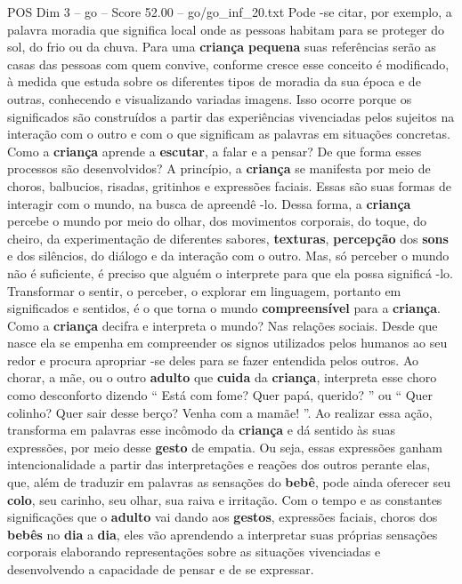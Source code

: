 \begin{textsample}{POS Dim 3 – go – Score 52.00 – go/go\_inf\_20.txt}
Pode -se citar, por exemplo, a palavra moradia que significa local onde as pessoas habitam para se proteger do sol, do frio ou da chuva.
Para uma \textbf{criança} \textbf{pequena} suas referências serão as casas das pessoas com quem convive, conforme cresce esse conceito é modificado, à medida que estuda sobre os diferentes tipos de moradia da sua época e de outras, conhecendo e visualizando variadas imagens.
Isso ocorre porque os significados são construídos a partir das experiências vivenciadas pelos sujeitos na interação com o outro e com o que significam as palavras em situações concretas.
Como a \textbf{criança} aprende a \textbf{escutar}, a falar e a pensar?
De que forma esses processos são desenvolvidos?
A princípio, a \textbf{criança} se manifesta por meio de choros, balbucios, risadas, gritinhos e expressões faciais.
Essas são suas formas de interagir com o mundo, na busca de apreendê -lo.
Dessa forma, a \textbf{criança} percebe o mundo por meio do olhar, dos movimentos corporais, do toque, do cheiro, da experimentação de diferentes sabores, \textbf{texturas}, \textbf{percepção} dos \textbf{sons} e dos silêncios, do diálogo e da interação com o outro.
Mas, só perceber o mundo não é suficiente, é preciso que alguém o interprete para que ela possa significá -lo.
Transformar o sentir, o perceber, o explorar em linguagem, portanto em significados e sentidos, é o que torna o mundo \textbf{compreensível} para a \textbf{criança}.
Como a \textbf{criança} decifra e interpreta o mundo?
Nas relações sociais.
Desde que nasce ela se empenha em compreender os signos utilizados pelos humanos ao seu redor e procura apropriar -se deles para se fazer entendida pelos outros.
Ao chorar, a mãe, ou o outro \textbf{adulto} que \textbf{cuida} da \textbf{criança}, interpreta esse choro como desconforto dizendo “ Está com fome?
Quer papá, querido? ” ou “ Quer colinho?
Quer sair desse berço?
Venha com a mamãe! ”.
Ao realizar essa ação, transforma em palavras esse incômodo da \textbf{criança} e dá sentido às suas expressões, por meio desse \textbf{gesto} de empatia.
Ou seja, essas expressões ganham intencionalidade a partir das interpretações e reações dos outros perante elas, que, além de traduzir em palavras as sensações do \textbf{bebê}, pode ainda oferecer seu \textbf{colo}, seu carinho, seu olhar, sua raiva e irritação.
Com o tempo e as constantes significações que o \textbf{adulto} vai dando aos \textbf{gestos}, expressões faciais, choros dos \textbf{bebês} no \textbf{dia} a \textbf{dia}, eles vão aprendendo a interpretar suas próprias sensações corporais elaborando representações sobre as situações vivenciadas e desenvolvendo a capacidade de pensar e de se expressar.

\end{textsample}
